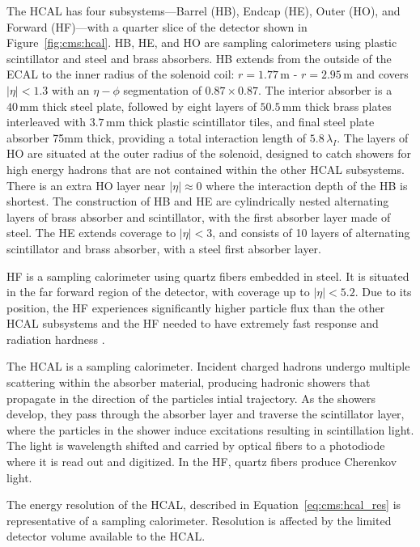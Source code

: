 The HCAL has four subsystems---Barrel (HB), Endcap (HE), Outer (HO), and Forward (HF)---with a quarter slice of the detector shown in Figure~\ref{fig:cms:hcal}.  HB, HE, and HO are sampling calorimeters using plastic scintillator and steel and brass absorbers. HB extends from the outside of the ECAL to the inner radius of the solenoid coil: $r=1.77\,\mathrm{m}$ - $r=2.95\,\mathrm{m}$ and covers $|\eta| < 1.3$ with an $\eta-\phi$ segmentation of $0.87\times0.87$. The interior absorber is a $40\,\mathrm{mm}$ thick steel plate, followed by eight layers of $50.5\,\mathrm{mm}$ thick brass plates interleaved with $3.7\,\mathrm{mm}$ thick plastic scintillator tiles, and final steel plate absorber 75mm thick, providing a total interaction length of $5.8\,\lambda_I$. The layers of HO are situated at the outer radius of the solenoid, designed to catch showers for high energy hadrons that are not contained within the other HCAL subsystems. There is an extra HO layer near $|\eta|\approx 0$ where the interaction depth of the HB is shortest. The construction of HB and HE are cylindrically nested alternating layers of brass absorber and scintillator, with the first absorber layer made of steel. The HE extends coverage to $|\eta| < 3$, and consists of 10 layers of alternating scintillator and brass absorber, with a steel first absorber layer.

HF is a sampling calorimeter using quartz fibers embedded in steel. It is situated in the far forward region of the detector, with coverage up to $|\eta| < 5.2$. Due to its position, the HF experiences significantly higher particle flux than the other HCAL subsystems and the HF needed to have extremely fast response and radiation hardness
\cite{CERN-LHCC-97-031}.




The HCAL is a sampling calorimeter. Incident charged hadrons undergo multiple scattering within the absorber material, producing hadronic showers that propagate in the direction of the particles intial trajectory. As the showers develop, they pass through the absorber layer and traverse the scintillator layer, where the particles in the shower induce excitations resulting in scintillation light. The light is wavelength shifted and carried by optical fibers to a photodiode where it is read out and digitized. In the HF, quartz fibers produce Cherenkov light. 



The energy resolution of the HCAL, described in Equation~\ref{eq:cms:hcal_res} is representative of a sampling calorimeter. Resolution is affected by the limited detector volume available to the HCAL\cite{Cavallari_2011}.

